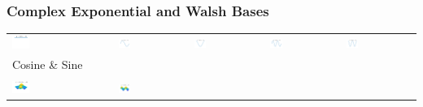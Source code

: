 \documentclass[11pt,compress,xcolor={usenames,dvipsnames},aspectratio=169]{beamer}
\begin{document}
\begin{frame}
\frametitle{Complex Exponential and Walsh Bases}
\vspace{-3ex}
	\begin{tabular}{>{\centering}m{}>{\centering}m{}>{\centering}m{}>{\centering}m{}>{\centering}m{}}
		\includegraphics[width =0.18\textwidth]{ProgramsImages/CosineSine_Degree_0.png}  &
		\includegraphics[width =0.18\textwidth]{ProgramsImages/CosineSine_Degree_1.png}  &
		\includegraphics[width =0.18\textwidth]{ProgramsImages/CosineSine_Degree_2.png}  &
		\includegraphics[width =0.18\textwidth]{ProgramsImages/CosineSine_Degree_3.png}  &
		\includegraphics[width =0.18\textwidth]{ProgramsImages/CosineSine_Degree_4.png} 
	\tabularnewline[-7ex]
	Cosine \& Sine
	\tabularnewline
	\tabularnewline
		\includegraphics[width =0.18\textwidth]{ProgramsImages/CosineSine_Degree_1_1.png}  &
\includegraphics[width =0.18\textwidth]{ProgramsImages/CosineSine_Degree_1_2.png}  &

\end{tabular}
\end{frame}
\end{document}
